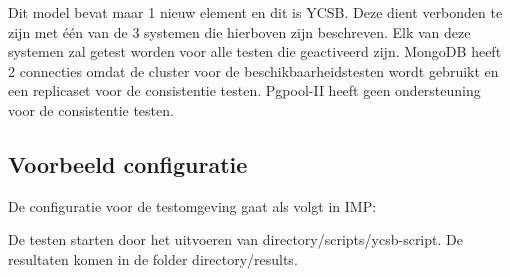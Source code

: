 Dit model bevat maar 1 nieuw element en dit is YCSB. Deze dient verbonden te zijn met één van de 3 systemen die hierboven zijn beschreven. Elk van deze systemen zal getest worden voor alle testen die geactiveerd zijn. MongoDB heeft 2 connecties omdat de cluster voor de beschikbaarheidstesten wordt gebruikt en een replicaset voor de consistentie testen. Pgpool-II heeft geen ondersteuning voor de consistentie testen. 

\subsection{Voorbeeld configuratie}

De configuratie voor de testomgeving gaat als volgt in IMP: 



De testen starten door het uitvoeren van {{directory}}/scripts/ycsb-script. De resultaten komen in de folder {{directory}}/results. 

